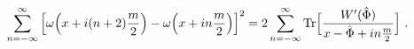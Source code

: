 \begin{equation}
\label{eq:loop}
\sum_{n=-\infty}^{\infty} \Big[\omega\Big(x+i(n+2)\frac m2\Big)-
  \omega\Big(x+in \frac m2\Big)\Big]^2=
2\sum_{n=-\infty}^{\infty}{\rm Tr} \Big[\frac{W'(\hat \Phi)}{x-\hat
  \Phi+in\frac m2} \Big]\ .
\end{equation}

